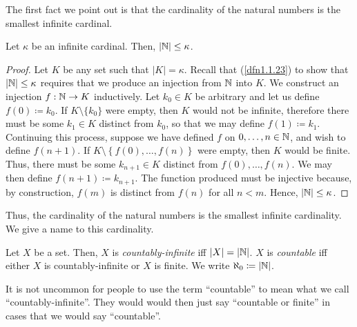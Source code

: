 The first fact we point out is that the cardinality of the natural numbers is the smallest infinite cardinal.
\begin{prp}
Let $\kappa$ be an infinite cardinal.  Then, $|\mathbb{N} |\leq \kappa$.
\begin{proof}
Let $K$ be any set such that $|K|=\kappa$.  Recall that (\cref{dfn1.1.23}) to show that $|\mathbb{N} |\leq \kappa$ requires that we produce an injection from $\mathbb{N}$ into $K$.  We construct an injection $f:\mathbb{N} \rightarrow K$ inductively.  Let $k_0\in K$ be arbitrary and let us define $f(0)\coloneqq k_0$.  If $K\setminus \{ k_0\}$ were empty, then $K$ would not be infinite, therefore there must be some $k_1\in K$ distinct from $k_0$, so that we may define $f(1)\coloneqq k_1$.  Continuing this process, suppose we have defined $f$ on $0,\ldots ,n\in \mathbb{N}$, and wish to define $f(n+1)$.  If $K\setminus \left\{ f(0),\ldots ,f(n)\right\}$ were empty, then $K$ would be finite.  Thus, there must be some $k_{n+1}\in K$ distinct from $f(0),\ldots ,f(n)$.  We may then define $f(n+1)\coloneqq k_{n+1}$.  The function produced must be injective because, by construction, $f(m)$ is distinct from $f(n)$ for all $n<m$.  Hence, $|\mathbb{N} |\leq \kappa$.
\end{proof}
\end{prp}
Thus, the cardinality of the natural numbers is the smallest infinite cardinality.  We give a name to this cardinality.
\begin{dfn}[Countability]\label{dfn2.2}
Let $X$ be a set.  Then, $X$ is \emph{countably-infinite} iff $|X|=|\mathbb{N} |$.  $X$ is \emph{countable} iff either $X$ is countably-infinite or $X$ is finite.  We write $\aleph _0\coloneqq |\mathbb{N} |$.
\begin{rmk}
It is not uncommon for people to use the term ``countable'' to mean what we call ``countably-infinite''.  They would would then just say ``countable or finite'' in cases that we would say ``countable''.
\end{rmk}
\end{dfn}

